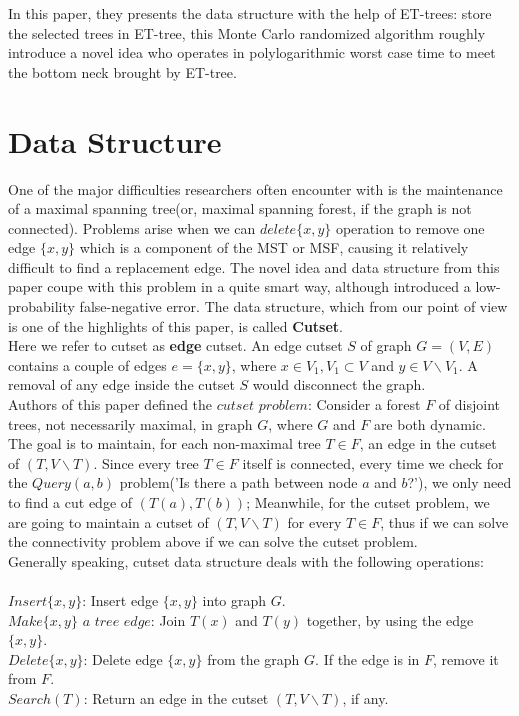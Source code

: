 \documentclass[conference,compsoc]{IEEEtran}
\begin{document}
In this paper, they presents the data structure with the help of ET-trees: store the selected trees in ET-tree, this Monte Carlo randomized algorithm roughly introduce a novel idea who operates in polylogarithmic worst case time to meet the bottom neck brought by ET-tree.

\section{Data Structure}
One of the major difficulties researchers often encounter with is the maintenance of a maximal spanning tree(or, maximal spanning forest, if the graph is not connected). Problems arise when we can $delete\{x,y\}$ operation to remove one edge $\{x,y\}$ which is a component of the MST or MSF, causing it relatively difficult to find a replacement edge. The novel idea and data structure from this paper coupe with this problem in a quite smart way, although introduced a low-probability false-negative error. The data structure, which from our point of view is one of the highlights of this paper, is called \textbf{Cutset}. \\
Here we refer to cutset as \textbf{edge} cutset. An edge cutset $S$ of graph $G=(V,E)$ contains a couple of edges $e=\{x,y\}$, where $x \in V_1,V_1 \subset V $ and $y \in V \backslash V_1$. A removal of any edge inside the cutset $S$ would disconnect the graph. \\
Authors of this paper defined the $cutset$ $problem$: Consider a forest $F$ of disjoint trees, not necessarily maximal, in graph $G$, where $G$ and $F$ are both dynamic. The goal is to maintain, for each non-maximal tree $T\in F$, an edge in the cutset of $(T,V\backslash T)$. Since every tree $T\in F$ itself is connected, every time we check for the $Query(a,b)$ problem('Is there a path between node $a$ and $b$?'), we only need to find a cut edge of $(T(a),T(b))$; Meanwhile, for the cutset problem, we are going to maintain a cutset of $(T,V\backslash T)$ for every $T \in F$, thus if we can solve the connectivity problem above if we can solve the cutset problem.\\
Generally speaking, cutset data structure deals with the following operations:\\\\
$Insert\{x,y\}$: Insert edge $\{x,y\}$ into graph $G$.\\
$Make \{x,y\}$ $a$ $tree$ $edge$: Join $T(x)$ and $T(y)$ together, by using the edge $\{x,y\}$.\\
$Delete\{x,y\}$: Delete edge $\{x,y\}$ from the graph $G$. If the edge is in $F$, remove it from $F$.\\
$Search(T)$: Return an edge in the cutset $(T,V\backslash T)$, if any.
\end{document}

